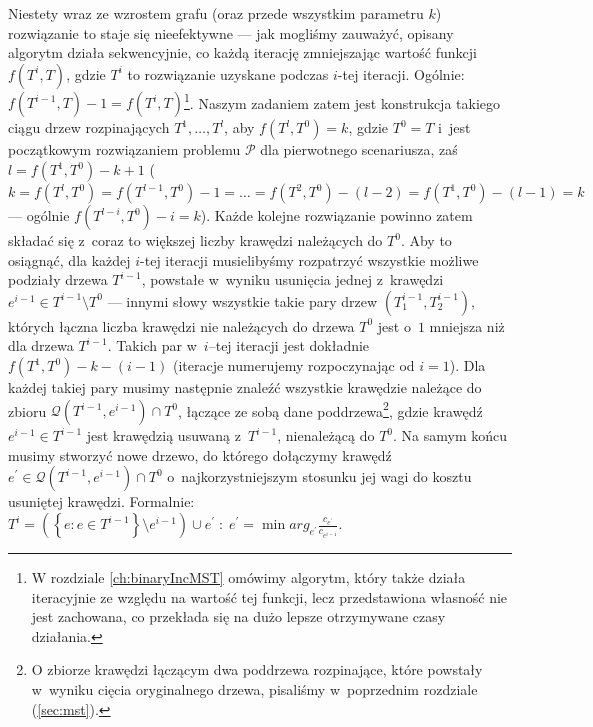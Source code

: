 Niestety wraz ze wzrostem grafu (oraz przede wszystkim parametru $k$) rozwiązanie to staje się nieefektywne --- jak mogliśmy zauważyć, opisany algorytm działa sekwencyjnie, co każdą iterację zmniejszając wartość funkcji $f \left( T^{i}, T \right)$, gdzie $T^{i}$ to rozwiązanie uzyskane podczas $i$-tej iteracji.
Ogólnie: $f \left( T^{i-1}, T \right) - 1 = f \left( T^{i}, T \right)$\footnote{
	W rozdziale \ref{ch:binaryIncMST} omówimy algorytm, który także działa iteracyjnie ze względu na wartość tej funkcji, lecz przedstawiona własność nie jest zachowana, co przekłada się na dużo lepsze otrzymywane czasy działania.
}.
Naszym zadaniem zatem jest konstrukcja takiego ciągu drzew rozpinających $T^{1}, \dots, T^{l}$, aby $f \left( T^{l}, T^{0} \right) = k$, gdzie $T^{0} = T$ i~jest początkowym rozwiązaniem problemu $\mathcal{P}$ dla pierwotnego scenariusza, zaś $l = f \left( T^{1}, T^{0} \right) - k + 1$ ($k = f \left( T^{l}, T^{0} \right) = f \left( T^{l-1}, T^{0} \right) - 1 = \dots =  f \left( T^{2}, T^{0} \right) - \left( l - 2 \right) = f \left( T^{1}, T^{0} \right) - \left( l - 1 \right) = k$ --- ogólnie $f \left( T^{l - i}, T^{0} \right) - i = k$).
Każde kolejne rozwiązanie powinno zatem składać się z~coraz to większej liczby krawędzi należących do $T^{0}$.
Aby to osiągnąć, dla każdej $i$-tej iteracji musielibyśmy rozpatrzyć wszystkie możliwe podziały drzewa $T^{i-1}$, powstałe w~wyniku usunięcia jednej z~krawędzi $e^{i-1} \in T^{i-1} \setminus T^{0}$ --- innymi słowy wszystkie takie pary drzew $\left( T^{i-1}_{1}, T^{i-1}_{2} \right)$, których łączna liczba krawędzi nie należących do drzewa $T^{0}$ jest o~$1$ mniejsza niż dla drzewa $T^{i-1}$. 
Takich par w~$i$--tej iteracji jest dokładnie $f \left( T^{1}, T^{0} \right) - k - \left( i - 1 \right)$ (iteracje numerujemy rozpoczynając od $i = 1$).
Dla każdej takiej pary musimy następnie znaleźć wszystkie krawędzie należące do zbioru $\mathcal{Q} \left( T^{i-1}, e^{i-1} \right) \cap T^{0}$, łączące ze sobą dane poddrzewa\footnote{
	O zbiorze krawędzi łączącym dwa poddrzewa rozpinające, które powstały w~wyniku cięcia oryginalnego drzewa, pisaliśmy w~poprzednim rozdziale (\ref{sec:mst}).
}, gdzie krawędź $e^{i-1} \in T^{i-1}$ jest krawędzią usuwaną z~$T^{i-1}$, nienależącą do $T^{0}$.
Na samym końcu musimy stworzyć nowe drzewo, do którego dołączymy krawędź $e^{\prime} \in \mathcal{Q} \left( T^{i-1}, e^{i-1} \right) \cap T^{0}$ o~najkorzystniejszym stosunku jej wagi do kosztu usuniętej krawędzi.
Formalnie: $T^{i} = \left( \left\{ e : e \in T^{i-1} \right\} \setminus e^{i-1} \right) \cup e^{\prime} \; : \; e^{\prime} = \min arg_{e^{\prime}} \frac{c_{e^{\prime}}}{c_{e^{i-1}}}$. 

